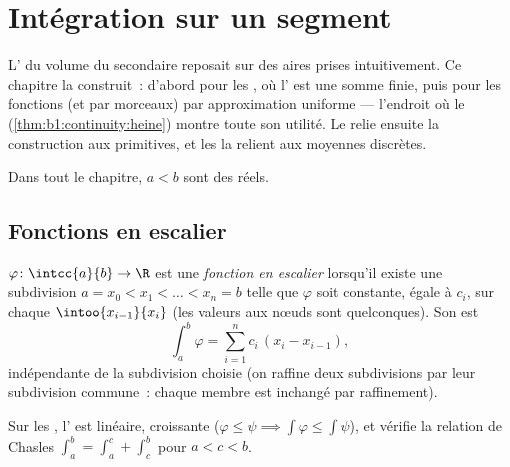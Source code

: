 \chapter{Intégration sur un segment}\label{ch:b1:integration}

L' du volume du secondaire reposait sur des aires prises
intuitivement. Ce chapitre la construit~: d'abord pour les , où l' est une somme finie, puis pour les
fonctions  (et  par morceaux) par approximation
uniforme --- l'endroit où le 
(\cref{thm:b1:continuity:heine}) montre toute son utilité. Le
 relie ensuite la construction aux
primitives, et les  la relient aux moyennes
discrètes.

Dans tout le chapitre, $a < b$ sont des réels.

\section{Fonctions en escalier}

\begin{definition}\label{def:b1:integration:step}
$\varphi \colon \intcc{a}{b} \to \R$ est une \emph{fonction en
escalier} lorsqu'il existe une
subdivision $a = x_0 < x_1 < \dots < x_n = b$ telle que $\varphi$
soit constante, égale à $c_i$, sur chaque  
$\intoo{x_{i-1}}{x_i}$ (les valeurs aux nœuds sont quelconques). Son
 est
\[
\int_a^b \varphi = \sum_{i=1}^{n} c_i\,(x_i - x_{i-1}),
\]
indépendante de la subdivision choisie (on raffine deux subdivisions
par leur subdivision commune~: chaque membre est inchangé par
raffinement).
\end{definition}

\begin{proposition}\label{prop:b1:integration:stepprops}
Sur les , l' est linéaire, croissante
($\varphi \leq \psi \implies \int\varphi \leq \int\psi$), et vérifie
la relation de Chasles $\int_a^b = \int_a^c + \int_c^b$ pour $a < c <
b$.
\end{proposition}

